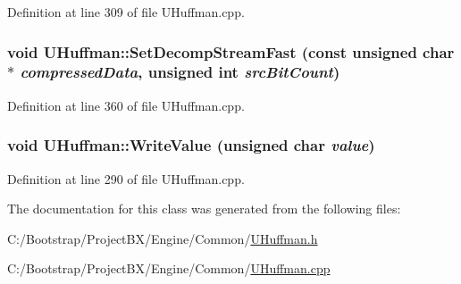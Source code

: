 Definition at line 309 of file UHuffman.cpp.\hypertarget{class_u_huffman_a6ec33a164afdf0b2dc7809a44603953}{
\subsubsection[{SetDecompStreamFast}]{\setlength{\rightskip}{0pt plus 5cm}void UHuffman::SetDecompStreamFast (const unsigned char $\ast$ {\em compressedData}, \/  unsigned int {\em srcBitCount})}}
\label{class_u_huffman_a6ec33a164afdf0b2dc7809a44603953}




Definition at line 360 of file UHuffman.cpp.\hypertarget{class_u_huffman_0eda249aa726754bc2c936f81d38dd7f}{
\subsubsection[{WriteValue}]{\setlength{\rightskip}{0pt plus 5cm}void UHuffman::WriteValue (unsigned char {\em value})}}
\label{class_u_huffman_0eda249aa726754bc2c936f81d38dd7f}




Definition at line 290 of file UHuffman.cpp.

The documentation for this class was generated from the following files:\begin{CompactItemize}
\item 
C:/Bootstrap/ProjectBX/Engine/Common/\hyperlink{_u_huffman_8h}{UHuffman.h}\item 
C:/Bootstrap/ProjectBX/Engine/Common/\hyperlink{_u_huffman_8cpp}{UHuffman.cpp}\end{CompactItemize}
